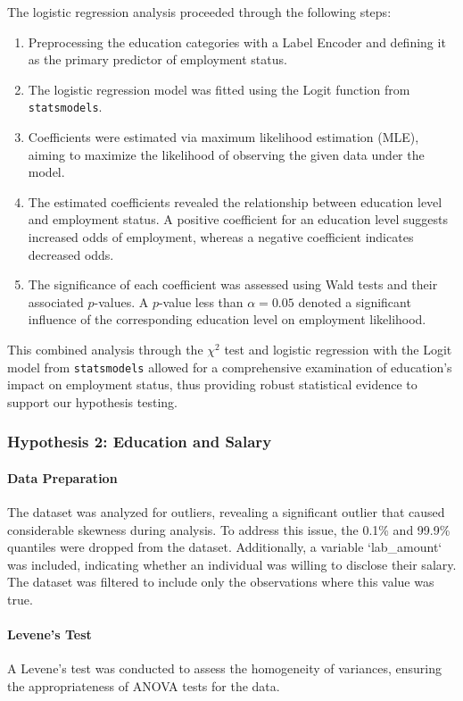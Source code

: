 The logistic regression analysis proceeded through the following steps:
\begin{enumerate}
    \item Preprocessing the education categories with a Label Encoder and defining it as the primary predictor of employment status.
    \item The logistic regression model was fitted using the Logit function from \texttt{statsmodels}.
    \item Coefficients were estimated via maximum likelihood estimation (MLE), aiming to maximize the likelihood of observing the given data under the model.
    \item The estimated coefficients revealed the relationship between education level and employment status. A positive coefficient for an education level suggests increased odds of employment, whereas a negative coefficient indicates decreased odds.
    \item The significance of each coefficient was assessed using Wald tests and their associated \( p \)-values. A \( p \)-value less than \( \alpha = 0.05 \) denoted a significant influence of the corresponding education level on employment likelihood.
\end{enumerate}

This combined analysis through the $\chi^2$ test and logistic regression with the Logit model from \texttt{statsmodels} allowed for a comprehensive examination of education's impact on employment status, thus providing robust statistical evidence to support our hypothesis testing.

\subsubsection{Hypothesis 2: Education and Salary}

\paragraph{Data Preparation}
The dataset was analyzed for outliers, revealing a significant outlier that caused considerable skewness during analysis. To address this issue, the 0.1\% and 99.9\% quantiles were dropped from the dataset. Additionally, a variable `lab\_amount` was included, indicating whether an individual was willing to disclose their salary. The dataset was filtered to include only the observations where this value was true.

\paragraph{Levene's Test}
A Levene's test was conducted to assess the homogeneity of variances, ensuring the appropriateness of ANOVA tests for the data.

